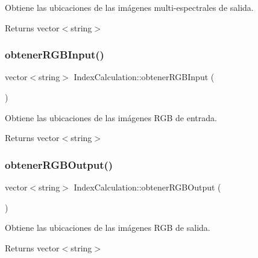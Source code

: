 Obtiene las ubicaciones de las imágenes multi-\/espectrales de salida. 

\begin{DoxyReturn}{Returns}
vector$<$string$>$ 
\end{DoxyReturn}
\mbox{\label{classIndexCalculation_aacf5294ab87007a511f9f9e9772855af}} 
\subsubsection{\texorpdfstring{obtener\+R\+G\+B\+Input()}{obtenerRGBInput()}}
{\footnotesize\ttfamily vector$<$string$>$ Index\+Calculation\+::obtener\+R\+G\+B\+Input (\begin{DoxyParamCaption}{ }\end{DoxyParamCaption})\hspace{0.3cm}{\ttfamily [inline]}}



Obtiene las ubicaciones de las imágenes R\+GB de entrada. 

\begin{DoxyReturn}{Returns}
vector$<$string$>$ 
\end{DoxyReturn}
\mbox{\label{classIndexCalculation_a23a9f9a23db086109989fb93450a70d7}} 
\subsubsection{\texorpdfstring{obtener\+R\+G\+B\+Output()}{obtenerRGBOutput()}}
{\footnotesize\ttfamily vector$<$string$>$ Index\+Calculation\+::obtener\+R\+G\+B\+Output (\begin{DoxyParamCaption}{ }\end{DoxyParamCaption})\hspace{0.3cm}{\ttfamily [inline]}}



Obtiene las ubicaciones de las imágenes R\+GB de salida. 

\begin{DoxyReturn}{Returns}
vector$<$string$>$ 
\end{DoxyReturn}
\mbox{\label{classIndexCalculation_a562111a1b8920fa0136811ecd7e51e36}} 
